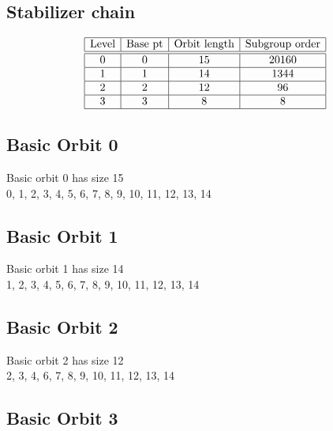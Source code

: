 \subsection*{Stabilizer chain}


$$
\begin{array}{|c|c|c|c|}
\hline
\mbox{Level} & \mbox{Base pt} & \mbox{Orbit length} & \mbox{Subgroup order}\\
\hline
\hline
0 & 0 & 15 & 20160\\
\hline
1 & 1 & 14 & 1344\\
\hline
2 & 2 & 12 & 96\\
\hline
3 & 3 & 8 & 8\\
\hline
\end{array}
$$

\subsection*{Basic Orbit 0}



Basic orbit 0 has size 15\\
0, 1, 2, 3, 4, 5, 6, 7, 8, 9, 10, 11, 12, 13, 14\\
\bigskip

\subsection*{Basic Orbit 1}



Basic orbit 1 has size 14\\
1, 2, 3, 4, 5, 6, 7, 8, 9, 10, 11, 12, 13, 14\\
\bigskip

\subsection*{Basic Orbit 2}



Basic orbit 2 has size 12\\
2, 3, 4, 6, 7, 8, 9, 10, 11, 12, 13, 14\\
\bigskip

\subsection*{Basic Orbit 3}



